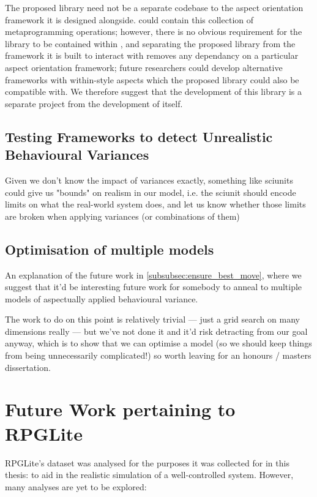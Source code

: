 The proposed library need not be a separate codebase to the aspect orientation
framework it is designed alongside. \pdsf{} could contain this collection of
metaprogramming operations; however, there is no obvious requirement for
the library to be contained within \pdsf{}, and separating the proposed library
from the framework it is built to interact with removes any dependancy on a
particular aspect orientation framework; future researchers could develop
alternative frameworks with within-style aspects which the proposed library
could also be compatible with. We therefore suggest that the development of this
library is a separate project from the development of \pdsf{} itself.



\subsection{Testing Frameworks to detect Unrealistic Behavioural
Variances}\label{sciunits_for_unrealistic_states}

Given we don't know the impact of variances exactly, something like sciunits
could give us "bounds" on realism in our model, i.e. the sciunit should encode
limits on what the real-world system does, and let us know whether those limits
are broken when applying variances (or combinations of them)


\subsection{Optimisation of multiple
models}\label{many_aspectual_models_to_optimise}

An explanation of the future work in \cref{subsubsec:ensure_best_move}, where we
suggest that it'd be interesting future work for somebody to anneal to multiple
models of aspectually applied behavioural variance. 

The work to do on this point is relatively trivial --- just a grid search on
many dimensions really --- but we've not done it and it'd risk detracting from
our goal anyway, which is to show that we can optimise a model (so we should
keep things from being unnecessarily complicated!) so worth leaving for an
honours / masters dissertation.




\section{Future Work pertaining to RPGLite}\label{sec:future_work_rpglite}
RPGLite's dataset was analysed for the purposes it was collected for in this
thesis: to aid in the realistic simulation of a well-controlled \sociotechnical
system. However, many analyses are yet to be explored:

